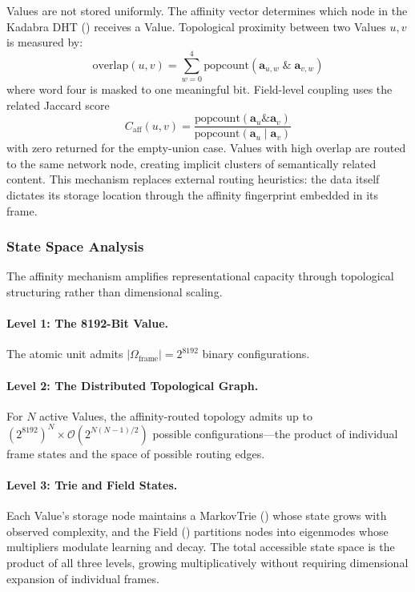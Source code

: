 Values are not stored uniformly.  The affinity vector determines which
node in the Kadabra DHT () receives a Value.
Topological proximity between two Values $u, v$ is measured by:
\begin{equation}
  \text{overlap}(u, v)
    = \sum_{w=0}^{4} \text{popcount}(\mathbf{a}_{u,w} \;\mathbin{\&}\; \mathbf{a}_{v,w})
  \label{eq:affinity_overlap}
\end{equation}
where word four is masked to one meaningful bit.  Field-level coupling
uses the related Jaccard score
\begin{equation}
  C_{\text{aff}}(u, v)
    = \frac{\text{popcount}(\mathbf{a}_u \mathbin{\&} \mathbf{a}_v)}
           {\text{popcount}(\mathbf{a}_u \mathbin{|} \mathbf{a}_v)}
  \label{eq:affinity_jaccard}
\end{equation}
with zero returned for the empty-union case.
Values with high overlap are routed to the same network node, creating
implicit clusters of semantically related content.  This mechanism
replaces external routing heuristics: the data itself dictates its
storage location through the affinity fingerprint embedded in its frame.

\subsubsection{State Space Analysis}
\label{sec:state_space}

The affinity mechanism amplifies representational capacity through
topological structuring rather than dimensional scaling.

\paragraph{Level 1: The 8192-Bit Value.}
The atomic unit admits $|\Omega_{\text{frame}}| = 2^{8192}$ binary
configurations.

\paragraph{Level 2: The Distributed Topological Graph.}
For $N$ active Values, the affinity-routed topology admits up to
$(2^{8192})^{N} \times \mathcal{O}(2^{N(N-1)/2})$ possible
configurations---the product of individual frame states and the
space of possible routing edges.

\paragraph{Level 3: Trie and Field States.}
Each Value's storage node maintains a MarkovTrie
() whose state grows with observed complexity, and
the Field () partitions nodes into eigenmodes whose
multipliers modulate learning and decay.  The total accessible state
space is the product of all three levels, growing multiplicatively
without requiring dimensional expansion of individual frames.
